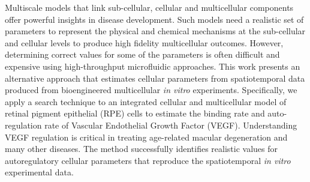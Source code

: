  \boldmath Multiscale models that link sub-cellular, cellular and multicellular components offer powerful insights in disease development. Such models need a realistic set of parameters to represent the physical and chemical mechanisms at the sub-cellular and cellular levels to produce high fidelity multicellular outcomes. However, determining correct values for some of the parameters is often difficult and expensive using high-throughput microfluidic approaches. This work presents an alternative approach that estimates cellular parameters from spatiotemporal data produced from bioengineered multicellular \textit{in vitro} experiments. Specifically, we apply a search technique to an integrated cellular and multicellular model of retinal pigment epithelial (RPE) cells to estimate the binding rate and auto-regulation rate of Vascular Endothelial Growth Factor (VEGF). Understanding VEGF regulation is critical in treating age-related macular degeneration and many other diseases. The method successfully identifies realistic values for autoregulatory cellular parameters that reproduce the spatiotemporal \textit{in vitro} experimental data.

